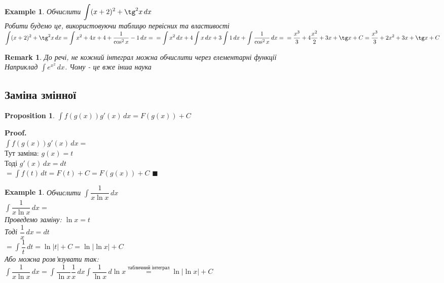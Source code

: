 \documentclass[a4paper, 14pt]{extarticle}
\def\huge{\displaystyle}
\def\bigline{\vspace{5mm}\\}
\theoremstyle{theoremdd}
\theoremstyle{theoremdd}
\theoremstyle{theoremdd}
\theoremstyle{theoremdd}
\newtheorem{example}[theorem]{Example}
\theoremstyle{theoremdd}
\newtheorem{proposition}[theorem]{Proposition}
\theoremstyle{theoremdd}
\newtheorem{remark}[theorem]{Remark}
\theoremstyle{theoremdd}
\theoremstyle{theoremdd}
\newenvironment{pf}{\vspace*{-3mm} \textbf{Proof. \\}}{$\blacksquare$}
\begin{document}
\begin{example}
Обчислити $\huge \int (x+2)^2 + \tg^2 x \,dx$\\
Робити будемо це, використовуючи таблицю первісних та властивості\\
$\huge \int (x+2)^2 + \tg^2 x \,dx = \int x^2+4x+4 + \dfrac{1}{\cos^2 x} - 1\,dx = \\
= \int x^2 \,dx + 4 \int x \,dx + 3 \int 1 \,dx + \int \dfrac{1}{\cos^2 x}\,dx = \\
= \dfrac{x^3}{3} + 4 \dfrac{x^2}{2} + 3x + \tg x + C = \dfrac{x^3}{3} + 2x^2 + 3x + \tg x + C$
\end{example}

\begin{remark}
До речі, не кожний інтеграл можна обчислити через елементарні функції\\
Наприклад $\huge \int e^{x^2}\,dx$. Чому - це вже інша наука
\end{remark}
\medskip

\subsection{Заміна змінної}
\begin{proposition} 
$\huge \int f(g(x)) g'(x)\,dx = F(g(x)) + C$
\end{proposition}

\begin{pf}
$\huge \int f(g(x))g'(x)\,dx \boxed{=}$\\
Тут заміна: $g(x) = t$\\
Тоді $g'(x)\,dx = dt$\\
$\boxed{=} \huge \int f(t)\,dt = F(t) + C = F(g(x)) + C$
\end{pf}
\bigline

\begin{example}
Обчислити $\huge \int \dfrac{1}{x \ln x} \,dx$\\
$\huge \int \dfrac{1}{x \ln x} \,dx \boxed{=} $\\
Проведемо заміну: $\ln x = t$\\
Тоді $\dfrac{1}{x}\,dx = dt$\\
$\boxed{=} \huge \int \dfrac{1}{t}\,dt = \ln |t| + C = \ln |\ln x| + C$\\
Або можна розв'язувати так:\\
$\huge \int \dfrac{1}{x \ln x} \,dx = \int \dfrac{1}{\ln x} \dfrac{1}{x} \,dx \int \dfrac{1}{\ln x} \,d \ln x \overset{\text{табличний інтеграл}}{=} \ln | \ln x| + C$
\end{example}
\end{document}

